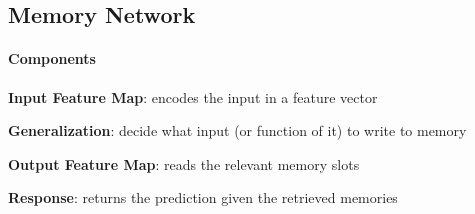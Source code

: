 \documentclass[10pt]{report}
\begin{document}
\subsection{Memory Network}
\paragraph{Components}\begin{list}{}{}
	\item \textbf{Input Feature Map}: encodes the input in a feature vector
	\item \textbf{Generalization}: decide what input (or function of it) to write to memory
	\item \textbf{Output Feature Map}: reads the relevant memory slots
	\item \textbf{Response}: returns the prediction given the retrieved memories
\end{list}
\end{document}
